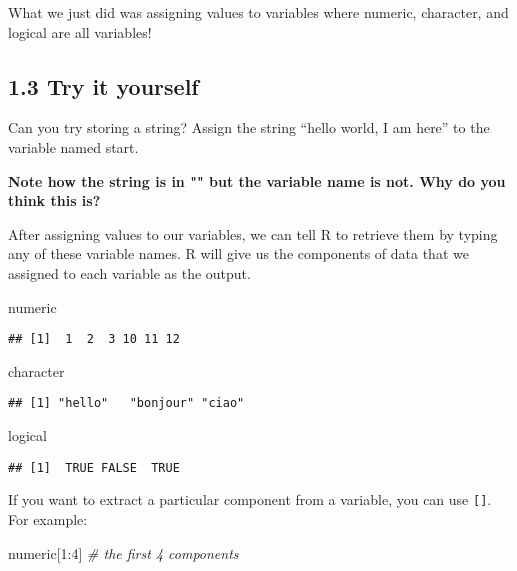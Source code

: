 \documentclass[
]{book}
\newenvironment{Shaded}{\begin{snugshade}}{\end{snugshade}}
\newcommand{\CommentTok}[1]{\textcolor[rgb]{0.56,0.35,0.01}{\textit{#1}}}
\newcommand{\DecValTok}[1]{\textcolor[rgb]{0.00,0.00,0.81}{#1}}
\newcommand{\NormalTok}[1]{#1}
\newcommand{\SpecialCharTok}[1]{\textcolor[rgb]{0.00,0.00,0.00}{#1}}
\begin{document}
What we just did was assigning values to variables where numeric, character, and logical are all variables!

\hypertarget{try-it-yourself-2}{%
\subsection{1.3 Try it yourself}\label{try-it-yourself-2}}

Can you try storing a string? Assign the string ``hello world, I am here'' to the variable named start.

\textbf{Note how the string is in "" but the variable name is not. Why do you think this is?}

After assigning values to our variables, we can tell R to retrieve them by typing any of these variable names. R will give us the components of data that we assigned to each variable as the output.

\begin{Shaded}
\begin{Highlighting}[]
\NormalTok{numeric}
\end{Highlighting}
\end{Shaded}

\begin{verbatim}
## [1]  1  2  3 10 11 12
\end{verbatim}

\begin{Shaded}
\begin{Highlighting}[]
\NormalTok{character}
\end{Highlighting}
\end{Shaded}

\begin{verbatim}
## [1] "hello"   "bonjour" "ciao"
\end{verbatim}

\begin{Shaded}
\begin{Highlighting}[]
\NormalTok{logical}
\end{Highlighting}
\end{Shaded}

\begin{verbatim}
## [1]  TRUE FALSE  TRUE
\end{verbatim}

If you want to extract a particular component from a variable, you can use \texttt{{[}{]}}. For example:

\begin{Shaded}
\begin{Highlighting}[]
\NormalTok{numeric[}\DecValTok{1}\SpecialCharTok{:}\DecValTok{4}\NormalTok{] }\CommentTok{\# the first 4 components}
\end{Highlighting}
\end{Shaded}
\end{document}
